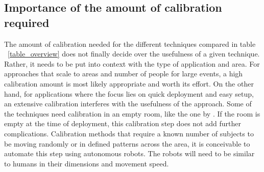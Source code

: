 \documentclass[conference]{IEEEtran}
\begin{document}
\subsection{Importance of the amount of calibration required}
The amount of calibration needed for the different techniques compared in table ~\ref{table_overview} does not finally decide over the usefulness of a given technique. Rather, it needs to be put into context with the type of application and area. For approaches that scale to areas and number of people for large events, a high calibration amount is most likely appropriate and worth its effort. On the other hand, for applications where the focus lies on quick deployment and easy setup, an extensive calibration interferes with the usefulness of the approach. Some of the techniques need calibration in an empty room, like the one by \cite{Xu}. If the room is empty at the time of deployment, this calibration step does not add further complications. Calibration methods that require a known number of subjects to be moving randomly or in defined patterns across the area, it is conceivable to automate this step using autonomous robots. The robots will need to be similar to humans in their dimensions and movement speed.
\end{document}
